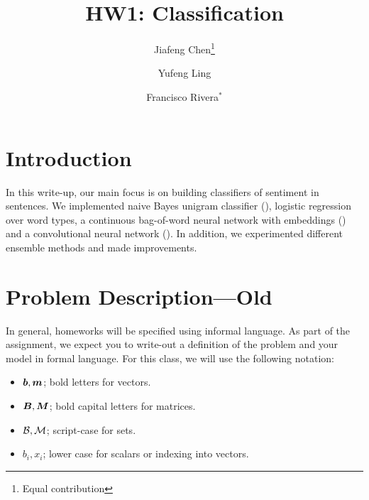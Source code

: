 \documentclass[11pt]{article}
\title{HW1: Classification}
\author{Jiafeng Chen\footnote{Equal contribution} \and Yufeng Ling \and
Francisco Rivera$^{*}$}
\begin{document}
\maketitle{}
\section{Introduction}




In this write-up, our main focus is on building classifiers of sentiment in sentences. We implemented naive Bayes unigram classifier (\cite{wang2012baselines}), logistic regression over word types, a continuous bag-of-word neural network with embeddings (\cite{mikolov2013efficient}) and a convolutional neural network (\cite{kim2014convolutional}). In addition, we experimented different ensemble methods and made improvements.


\section{Problem Description---Old}

In general, homeworks will be specified using informal
language. As part of the assignment, we expect you to write-out a
definition of the problem and your model in formal language. For this
class, we will use the following notation:

\begin{itemize}
\item $\boldsymbol{b}, \boldsymbol{m}$;  bold letters for vectors.
\item $\boldsymbol{B}, \boldsymbol{M}$;  bold capital letters for matrices.
\item $\mathcal{B}, \mathcal{M}$;  script-case for sets.
\item $b_i, x_i$; lower case for scalars or indexing into vectors.
\end{itemize}
\end{document}
